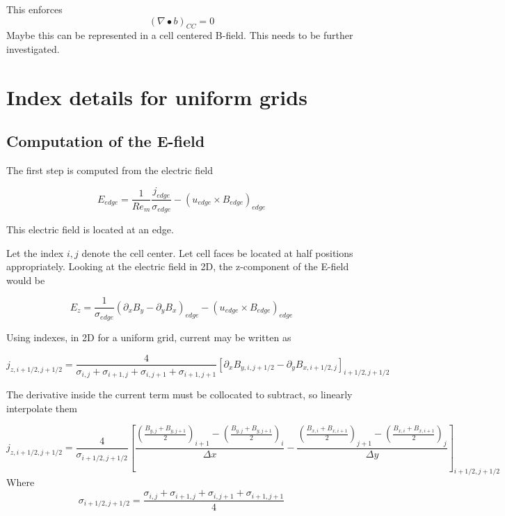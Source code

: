 \documentclass[11pt]{article}
\begin{document}
This enforces
\begin{equation}
	(\nabla \bullet b)_{CC} = 0
\end{equation}
Maybe this can be represented in a cell centered B-field. This needs to be further investigated.


\section{Index details for uniform grids}

\subsection{Computation of the E-field}
The first step is computed from the electric field

\begin{equation}
	E_{edge} = \frac{1}{Re_m} \frac{j_{edge}}{\sigma_{edge}} - 
	(u_{edge} \times B_{edge})_{edge}
\end{equation}

This electric field is located at an edge.

Let the index $i,j$ denote the cell center. Let cell faces be located at half positions appropriately. Looking at the electric field in 2D, the z-component of the E-field would be

\begin{equation}
	E_z = \frac{1}{\sigma_{edge}}
	(\partial_x B_y - \partial_y B_x)_{edge} - 
	(u_{edge} \times B_{edge})_{edge}
\end{equation}

Using indexes, in 2D for a uniform grid, current may be written as

\begin{equation}
	j_{z,i+1/2,j+1/2} = 
	\frac{4}{\sigma_{i,j} + \sigma_{i+1,j} + \sigma_{i,j+1} + \sigma_{i+1,j+1}}
	\left[
	\partial_x B_{y,i,j+1/2} - \partial_y B_{x,i+1/2,j}
	\right]_{i+1/2,j+1/2}
\end{equation}

The derivative inside the current term must be collocated to subtract, so linearly interpolate them

\begin{equation}
	j_{z,i+1/2,j+1/2} = 
	\frac{4}{\sigma_{i+1/2,j+1/2}}
	\left[
	\frac{ 
	\left(\frac{B_{y,j}+B_{y,j+1}}{2}\right)_{i+1}-\left(\frac{B_{y,j}+B_{y,j+1}}{2}\right)_{i}
	 }{\Delta x}
	-
	\frac{
	\left(\frac{B_{x,i}+B_{x,i+1}}{2}\right)_{j+1}-\left(\frac{B_{x,i}+B_{x,i+1}}{2}\right)_{j}
	}{\Delta y}
	\right]_{i+1/2,j+1/2}
\end{equation}
Where
\begin{equation}
	\sigma_{i+1/2,j+1/2} = 
	\frac{\sigma_{i,j} + \sigma_{i+1,j} + \sigma_{i,j+1} + \sigma_{i+1,j+1}}{4}
\end{equation}
\end{document}

